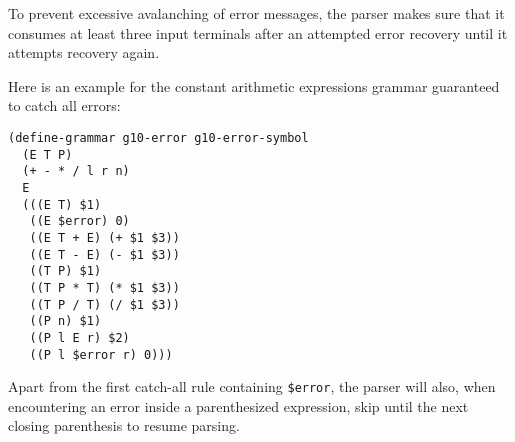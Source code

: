 \documentclass{article}
\newcommand{\codefont}[1]{\texttt{#1}}
\begin{document}
To prevent excessive avalanching of error messages, the parser makes
sure that it consumes at least three input terminals after an
attempted error recovery until it attempts recovery again.

Here is an example for the constant arithmetic expressions grammar
guaranteed to catch all errors:
%
\begin{verbatim}
(define-grammar g10-error g10-error-symbol
  (E T P)
  (+ - * / l r n)
  E
  (((E T) $1)
   ((E $error) 0)
   ((E T + E) (+ $1 $3))
   ((E T - E) (- $1 $3))
   ((T P) $1)
   ((T P * T) (* $1 $3))
   ((T P / T) (/ $1 $3))
   ((P n) $1)
   ((P l E r) $2)
   ((P l $error r) 0)))
\end{verbatim}
%
Apart from the first catch-all rule containing \codefont{\$error}, the
parser will also, when encountering an error inside a parenthesized
expression, skip until the next closing parenthesis to resume parsing.


 

\end{document}

